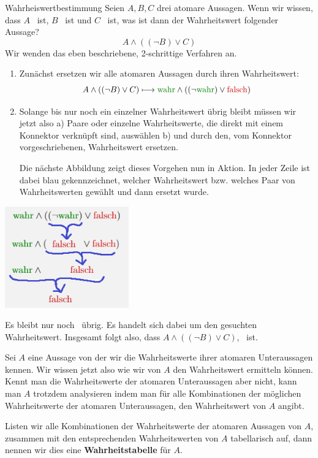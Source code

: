 \documentclass[../../main.tex]{subfiles}
\begin{document}
\begin{example}{Wahrheiswertbestimmung}
Seien $A, B, C$ drei atomare Aussagen. Wenn wir wissen, dass $A$ \wahr\  ist, $B$ \wahr\  ist und $C$ \falsch\   ist, was ist dann der Wahrheitswert folgender Aussage?
\[A \land ( (\lnot B) \lor C)\]
Wir wenden das eben beschriebene, 2-schrittige Verfahren an.
\begin{enumerate}
    \item Zunächst ersetzen wir alle atomaren Aussagen durch ihren Wahrheitswert:
    \[A \land ( (\lnot B) \lor C) \longmapsto  \wahr \land ((\lnot \wahr) \lor \falsch)\]
    \item Solange bis nur noch ein einzelner Wahrheitswert übrig bleibt müssen wir jetzt also a) Paare oder einzelne Wahrheitswerte, die direkt mit einem Konnektor verknüpft sind, auswählen b) und durch den, vom Konnektor vorgeschriebenen, Wahrheitswert ersetzen.
    
    Die nächste Abbildung zeigt dieses Vorgehen nun in Aktion. In jeder Zeile ist dabei blau gekennzeichnet, welcher Wahrheitswert bzw. welches Paar von Wahrheitswerten gewählt und dann ersetzt wurde. 
\end{enumerate}
\begin{center}
\includegraphics[width=0.4\textwidth]{images/TEMP_wahrheitsalg.png}
\end{center}
Es bleibt nur noch \falsch\  übrig. Es handelt sich dabei um den gesuchten Wahrheitswert. Insgesamt folgt also, dass $A \land ( (\lnot B) \lor C)$, \falsch\  ist.
\end{example}
Sei $A$ eine Aussage von der wir die Wahrheitswerte ihrer atomaren Unteraussagen kennen.
Wir wissen jetzt also wie wir von $A$ den Wahrheitswert ermitteln können. Kennt man die Wahrheitswerte der atomaren Unteraussagen aber nicht, kann man $A$ trotzdem analysieren indem man für alle Kombinationen der möglichen Wahrheitswerte der atomaren Unteraussagen, den Wahrheitswert von $A$ angibt.

Listen wir alle Kombinationen der Wahrheitswerte der atomaren Aussagen von $A$, zusammen mit den entsprechenden Wahrheitswerten von $A$ tabellarisch auf, dann nennen wir dies eine \textbf{Wahrheitstabelle} für $A$. 
\end{document}
